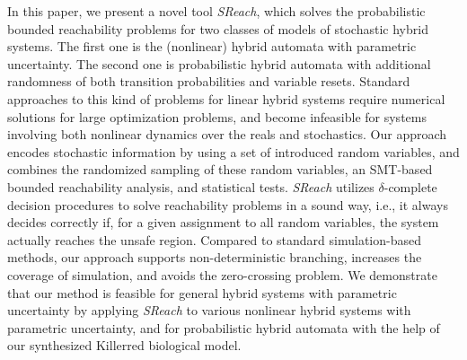 In this paper, we present a novel tool {\it SReach}, which solves the probabilistic bounded reachability problems for two classes of models of stochastic hybrid systems. The first one is the (nonlinear) hybrid automata with parametric uncertainty. The second one is probabilistic hybrid automata with additional randomness of both transition probabilities and variable resets. Standard approaches to this kind of problems for linear hybrid systems require numerical solutions for large optimization problems, and become infeasible for systems involving both nonlinear dynamics over the reals and stochastics. Our approach encodes stochastic information by using a set of introduced random variables, and combines the randomized sampling of these random variables, an SMT-based bounded reachability analysis, 
and statistical tests. {\it SReach} utilizes $\delta$-complete decision procedures 
to solve reachability problems in a sound way, i.e., it always decides correctly if, for a given
assignment to all random variables, the system actually reaches the unsafe region.
Compared to standard simulation-based methods, our approach supports 
non-deterministic branching, increases the coverage of simulation, and avoids the
zero-crossing problem. We demonstrate that our method is feasible for general
hybrid systems with parametric uncertainty by applying {\it SReach} to
various nonlinear hybrid systems with parametric uncertainty, and for probabilistic hybrid automata with the help of our synthesized  Killerred biological model.
